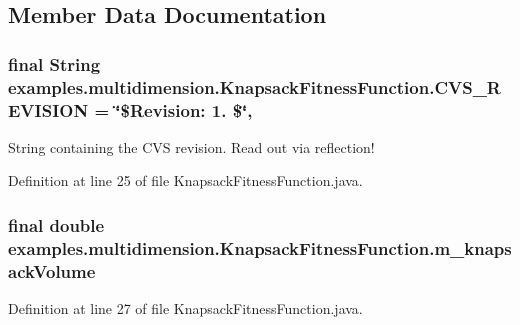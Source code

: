 \subsection{Member Data Documentation}
\hypertarget{classexamples_1_1multidimension_1_1_knapsack_fitness_function_a555b0625de82207f2543bb14f45bf9b0}{
\subsubsection[{C\-V\-S\-\_\-\-R\-E\-V\-I\-S\-I\-O\-N}]{\setlength{\rightskip}{0pt plus 5cm}final String examples.\-multidimension.\-Knapsack\-Fitness\-Function.\-C\-V\-S\-\_\-\-R\-E\-V\-I\-S\-I\-O\-N = \char`\"{}\$Revision\-: 1. \$\char`\"{}\hspace{0.3cm}{\ttfamily [static]}, {\ttfamily [private]}}}\label{classexamples_1_1multidimension_1_1_knapsack_fitness_function_a555b0625de82207f2543bb14f45bf9b0}
String containing the C\-V\-S revision. Read out via reflection! 

Definition at line 25 of file Knapsack\-Fitness\-Function.\-java.

\hypertarget{classexamples_1_1multidimension_1_1_knapsack_fitness_function_a308518c941040f58423d88a2325397ae}{
\subsubsection[{m\-\_\-knapsack\-Volume}]{\setlength{\rightskip}{0pt plus 5cm}final double examples.\-multidimension.\-Knapsack\-Fitness\-Function.\-m\-\_\-knapsack\-Volume\hspace{0.3cm}{\ttfamily [private]}}}\label{classexamples_1_1multidimension_1_1_knapsack_fitness_function_a308518c941040f58423d88a2325397ae}


Definition at line 27 of file Knapsack\-Fitness\-Function.\-java.



